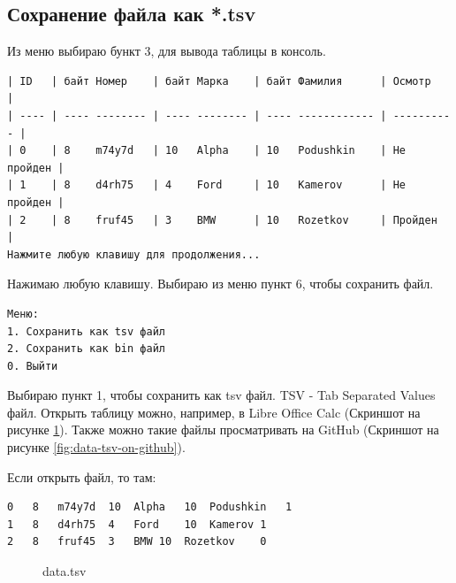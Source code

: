 \subsection{Сохранение файла как *.tsv}

Из меню выбираю бункт 3, для вывода таблицы в консоль.

\begin{tcolorbox}
\begin{verbatim}
| ID   | байт Номер    | байт Марка    | байт Фамилия      | Осмотр     |
| ---- | ---- -------- | ---- -------- | ---- ------------ | ---------- |
| 0    | 8    m74y7d   | 10   Alpha    | 10   Podushkin    | Не пройден |
| 1    | 8    d4rh75   | 4    Ford     | 10   Kamerov      | Не пройден |
| 2    | 8    fruf45   | 3    BMW      | 10   Rozetkov     | Пройден    |
Нажмите любую клавишу для продолжения...
\end{verbatim}
\end{tcolorbox}

Нажимаю любую клавишу. Выбираю из меню пункт 6, чтобы сохранить файл.

\begin{tcolorbox}
\begin{verbatim}
Меню:
1. Сохранить как tsv файл
2. Сохранить как bin файл
0. Выйти
\end{verbatim}
\end{tcolorbox}

Выбираю пункт 1, чтобы сохранить как tsv файл. TSV - Tab Separated Values файл. Открыть таблицу можно, например, в Libre Office Calc (Скриншот на рисунке \ref{fig:data-tsv}). Также можно такие файлы просматривать на GitHub (Скриншот на рисунке \ref{fig:data-tsv-on-github}).

Если открыть файл, то там:
\begin{tcolorbox}
\begin{verbatim}
0	8	m74y7d	10	Alpha	10	Podushkin	1
1	8	d4rh75	4	Ford	10	Kamerov	1
2	8	fruf45	3	BMW	10	Rozetkov	0
\end{verbatim}
\end{tcolorbox}

\begin{figure}[h]
    \caption{data.tsv}
    \label{fig:data-tsv}
\end{figure}

